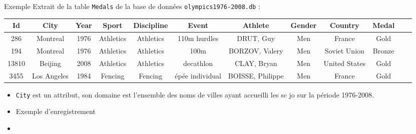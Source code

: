 \documentclass[10pt]{beamer}
\begin{document}
\begin{frame}{\Ctitle}{\stitle}
	\begin{exampleblock}{Exemple}
		Extrait de la table {\tt Medals} de la base de données {\tt olympics1976-2008.db} :\\
		\begin{tabular}{|>{\tiny}c|>{\tiny}c|>{\tiny}c|>{\tiny}c|>{\tiny}c|>{\tiny}c|>{\tiny}c|>{\tiny}c|>{\tiny}c|>{\tiny}c|>{\tiny}c|>{\tiny}c|}
			\hline
			Id                     & City        & Year & Sport     & Discipline & Event           & Athlete          & Gender & Country       & Medal  \\
			\hline
			\rowcolor{Apricot} 286 & Montreal    & 1976 & Athletics & Athletics  & 110m hurdles    & DRUT, Guy        & Men    & France        & Gold   \\
			\hline
			194                    & Montreal    & 1976 & Athletics & Athletics  & 100m            & BORZOV, Valery   & Men    & Soviet Union  & Bronze \\
			\hline
			13810                  & Beijing     & 2008 & Athletics & Athletics  & decathlon       & CLAY, Bryan      & Men    & United States & Gold   \\
			\hline
			3455                   & Los Angeles & 1984 & Fencing   & Fencing    & épée individual & BOISSE, Philippe & Men    & France        & Gold   \\
			\hline
		\end{tabular}
		\begin{itemize}
			\item<1->{\tt City} est un attribut, son domaine est l'ensemble des noms de villes ayant accueilli les {sc jo} sur la période 1976-2008.
			\item<1->\textcolor{BrickRed}{Exemple d'enregistrement}
			\item
		\end{itemize}
	\end{exampleblock}
\end{frame}
\end{document}

